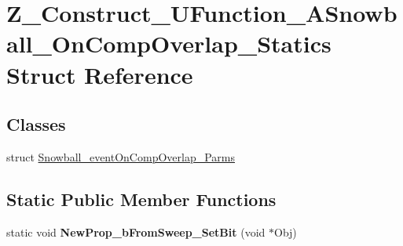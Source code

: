 \hypertarget{struct_z___construct___u_function___a_snowball___on_comp_overlap___statics}{}\section{Z\+\_\+\+Construct\+\_\+\+U\+Function\+\_\+\+A\+Snowball\+\_\+\+On\+Comp\+Overlap\+\_\+\+Statics Struct Reference}
\label{struct_z___construct___u_function___a_snowball___on_comp_overlap___statics}
\subsection*{Classes}
\begin{DoxyCompactItemize}
\item 
struct \mbox{\hyperlink{struct_z___construct___u_function___a_snowball___on_comp_overlap___statics_1_1_snowball__event_on_comp_overlap___parms}{Snowball\+\_\+event\+On\+Comp\+Overlap\+\_\+\+Parms}}
\end{DoxyCompactItemize}
\subsection*{Static Public Member Functions}
\begin{DoxyCompactItemize}
\item 
\mbox{\label{struct_z___construct___u_function___a_snowball___on_comp_overlap___statics_a652d1b9af9ac39a1cd6786cc872c8606}} 
static void {\bfseries New\+Prop\+\_\+b\+From\+Sweep\+\_\+\+Set\+Bit} (void $\ast$Obj)
\end{DoxyCompactItemize}
